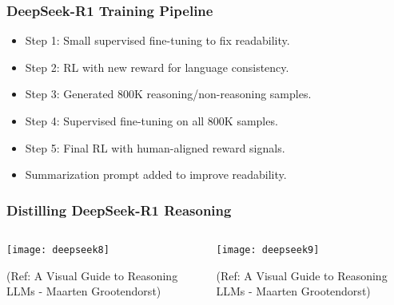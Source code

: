 \begin{frame}[fragile]\frametitle{DeepSeek-R1 Training Pipeline}

      \begin{itemize}
        \item Step 1: Small supervised fine-tuning to fix readability.
        \item Step 2: RL with new reward for language consistency.
        \item Step 3: Generated 800K reasoning/non-reasoning samples.
        \item Step 4: Supervised fine-tuning on all 800K samples.
        \item Step 5: Final RL with human-aligned reward signals.
        \item Summarization prompt added to improve readability.
      \end{itemize}

\end{frame}

\begin{frame}[fragile]\frametitle{Distilling DeepSeek-R1 Reasoning}
\begin{columns}
    \begin{column}[T]{0.5\linewidth}
        \begin{center}
        \texttt{[image: deepseek8]}
		
		{\tiny (Ref: A Visual Guide to Reasoning LLMs - Maarten Grootendorst)}
		
        \end{center} 
    \end{column}
    \begin{column}[T]{0.5\linewidth}
        \begin{center}
        \texttt{[image: deepseek9]}
		
		{\tiny (Ref: A Visual Guide to Reasoning LLMs - Maarten Grootendorst)}
		
        \end{center}    
    \end{column}
  \end{columns}
\end{frame}


